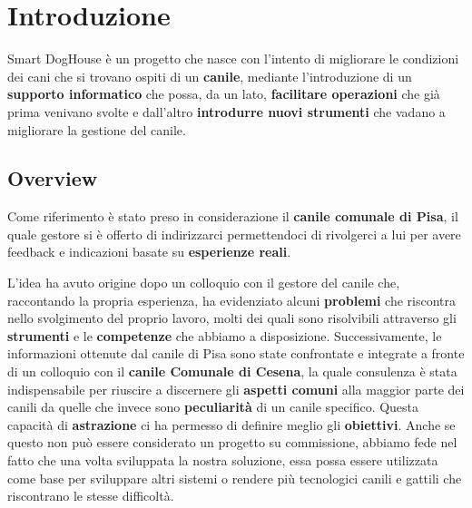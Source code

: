 

\chapter{Introduzione}
Smart DogHouse è un progetto che nasce con l'intento di migliorare le condizioni dei cani che si trovano ospiti di un \textbf{canile}, mediante l'introduzione di un \textbf{supporto informatico} che possa, da un lato, \textbf{facilitare operazioni} che già prima venivano svolte e dall'altro \textbf{introdurre nuovi strumenti} che vadano a migliorare la gestione del canile.

\section{Overview}
Come riferimento è stato preso in considerazione il \textbf{ canile comunale di Pisa}, il quale gestore si è offerto di indirizzarci permettendoci di rivolgerci a lui per avere feedback e indicazioni basate su \textbf{esperienze reali}. 

L'idea ha avuto origine dopo un colloquio con il gestore del canile che, raccontando la propria esperienza, ha evidenziato alcuni \textbf{problemi} che riscontra nello svolgimento del proprio lavoro, molti dei quali sono risolvibili attraverso gli \textbf{strumenti} e le \textbf{competenze} che abbiamo a disposizione.
Successivamente, le informazioni ottenute dal canile di Pisa sono state confrontate e integrate a fronte di un colloquio con il \textbf{canile Comunale di Cesena}, la quale consulenza è stata indispensabile per riuscire a discernere gli \textbf{aspetti comuni }alla maggior parte dei canili da quelle che invece sono \textbf{peculiarità} di un canile specifico. Questa capacità di \textbf{astrazione} ci ha permesso di definire meglio gli \textbf{obiettivi}. 
Anche se questo non può essere considerato un progetto su commissione, abbiamo fede nel fatto che una volta sviluppata la nostra soluzione, essa possa essere utilizzata come base per sviluppare altri sistemi o rendere più tecnologici canili e gattili che riscontrano le stesse difficoltà.

